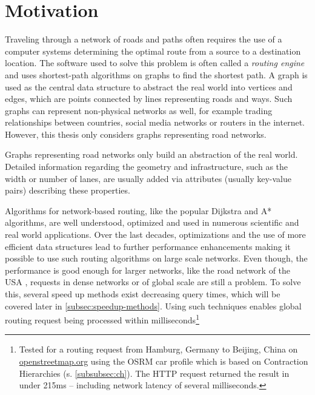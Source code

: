
\section{Motivation}
	
	Traveling through a network of roads and paths often requires the use of a computer systems determining the optimal route from a source to a destination location.
	The software used to solve this problem is often called a \emph{routing engine} and uses shortest-path algorithms on graphs to find the shortest path.
	A graph is used as the central data structure to abstract the real world into vertices and edges, which are points connected by lines representing roads and ways.
	Such graphs can represent non-physical networks as well, for example trading relationships between countries, social media networks or routers in the internet.
	However, this thesis only considers graphs representing road networks.
	
	Graphs representing road networks only build an abstraction of the real world.
	Detailed information regarding the geometry and infrastructure, such as the width or number of lanes, are usually added via attributes (usually key-value pairs) describing these properties.
	
	Algorithms for network-based routing, like the popular Dijkstra and A* algorithms, are well understood, optimized and used in numerous scientific and real world applications.
	Over the last decades, optimizations and the use of more efficient data structures lead to further performance enhancements making it possible to use such routing algorithms on large scale networks.
	Even though, the performance is good enough for larger networks, like the road network of the USA \cite{aviram-optimizing-dijkstra}, requests in dense networks or of global scale are still a problem.
	To solve this, several speed up methods exist decreasing query times, which will be covered later in \cref{subsec:speedup-methods}.
	Using such techniques enables global routing request being processed within milliseconds\footnote{Tested for a routing request from Hamburg, Germany to Beijing, China on \href{https://www.openstreetmap.org/directions?engine=fossgis\_osrm\_car&route=53.55\%2C10.00\%3B39.91\%2C116.39}{openstreetmap.org} using the OSRM car profile which is based on Contraction Hierarchies (s. \cref{subsubsec:ch}). The HTTP request returned the result in under 215ms -- including network latency of several milliseconds.}
	
